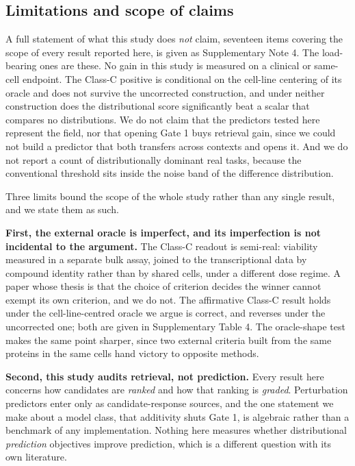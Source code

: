 \documentclass[11pt,letterpaper]{article}
\begin{document}
\subsection*{Limitations and scope of claims}

A full statement of what this study does \emph{not} claim, seventeen items covering the scope of
every result reported here, is given as Supplementary Note 4. The load-bearing ones are these. No
gain in this study is measured on a clinical or same-cell endpoint. The Class-C positive is
conditional on the cell-line centering of its oracle and does not survive the uncorrected
construction, and under neither construction does the distributional score significantly beat a
scalar that compares no distributions. We do not claim that the predictors tested here represent
the field, nor that opening Gate 1 buys retrieval gain, since we could not build a predictor that
both transfers across contexts and opens it. And we do not report a count of distributionally
dominant real tasks, because the conventional threshold sits inside the noise band of the
difference distribution.

Three limits bound the scope of the whole study rather than any single result, and we state them
as such.

\textbf{First, the external oracle is imperfect, and its imperfection is not incidental to the
argument.} The Class-C readout is semi-real: viability measured in a separate bulk assay, joined
to the transcriptional data by compound identity rather than by shared cells, under a different
dose regime. A paper whose thesis is that the choice of criterion decides the winner cannot exempt
its own criterion, and we do not. The affirmative Class-C result holds under the cell-line-centred
oracle we argue is correct, and reverses under the uncorrected one; both are given in
Supplementary Table 4. The oracle-shape test makes the same point sharper, since two external
criteria built from the same proteins in the same cells hand victory to opposite methods.

\textbf{Second, this study audits retrieval, not prediction.} Every result here concerns how
candidates are \emph{ranked} and how that ranking is \emph{graded}. Perturbation predictors enter
only as candidate-response sources, and the one statement we make about a model class, that
additivity shuts Gate 1, is algebraic rather than a benchmark of any implementation. Nothing here
measures whether distributional \emph{prediction} objectives improve prediction, which is a
different question with its own literature\cite{CellOT,Departures,CellFlow}.
\end{document}
